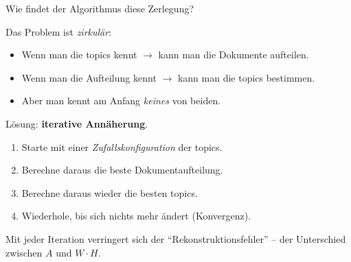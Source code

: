 \documentclass[aspectratio=169,11pt]{beamer}
\let\oldemph\emph
\renewcommand{\emph}[1]{{\color{solCyan}\oldemph{#1}}}
\let\oldtextbf\textbf
\renewcommand{\textbf}[1]{{\color{solBase3}\oldtextbf{#1}}}
\begin{document}
\begin{frame}{Wie findet der Algorithmus diese Zerlegung?}

  Das Problem ist \emph{zirkulär}:
  \begin{itemize}
    \item Wenn man die topics kennt $\rightarrow$ kann man die Dokumente
          aufteilen.
    \item Wenn man die Aufteilung kennt $\rightarrow$ kann man die
          topics bestimmen.
    \item Aber man kennt am Anfang \emph{keines} von beiden.
  \end{itemize}

  \vfill
  Lösung: \textbf{iterative Annäherung}.
  \begin{enumerate}
    \item Starte mit einer \emph{Zufallskonfiguration} der topics.
    \item Berechne daraus die beste Dokumentaufteilung.
    \item Berechne daraus wieder die besten topics.
    \item Wiederhole, bis sich nichts mehr ändert (Konvergenz).
  \end{enumerate}

  \vfill
  \footnotesize\color{black!60}
  Mit jeder Iteration verringert sich der \enquote{Rekonstruktionsfehler}
  – der Unterschied zwischen $A$ und $W\cdot H$.

\end{frame}
\end{document}
